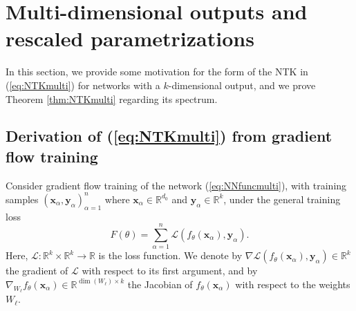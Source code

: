 \documentclass{article}
\theoremstyle{definition}
\newcommand{\R}{\mathbb{R}}
\newcommand{\x}{\mathbf{x}}
\newcommand{\y}{\mathbf{y}}
\renewcommand{\a}{\alpha}
\newcommand{\1}{\mathbf{1}}
\begin{document}
\section{Multi-dimensional outputs and rescaled
parametrizations}\label{appendix:NTKmulti}

In this section, we provide some motivation for the form of the NTK 
in (\ref{eq:NTKmulti}) for networks with a $k$-dimensional output,
and we prove Theorem \ref{thm:NTKmulti} regarding its spectrum.

\subsection{Derivation of (\ref{eq:NTKmulti}) from gradient flow training}
\label{appendix:NTKmultiderivation}

Consider gradient flow training of the network (\ref{eq:NNfuncmulti}), with
training samples
$(\x_\a,\y_\a)_{\a=1}^n$ where $\x_\a \in \R^{d_0}$ and $\y_\a \in \R^k$,
under the general training loss
\[F(\theta)=\sum_{\a=1}^n \mathcal{L}(f_\theta(\x_\a),\y_\a).\]
Here, $\mathcal{L}:\R^k \times \R^k \to \R$ is the loss function.
We denote by $\nabla \mathcal{L}(f_\theta(\x_\a),\y_\a) \in \R^k$ the gradient
of $\mathcal{L}$ with respect to its first argument, and by
$\nabla_{W_\ell} f_\theta(\x_\a)\in \R^{\dim(W_\ell) \times k}$ the Jacobian
of $f_\theta(\x_\a)$ with respect to the weights $W_\ell$.
\end{document}
